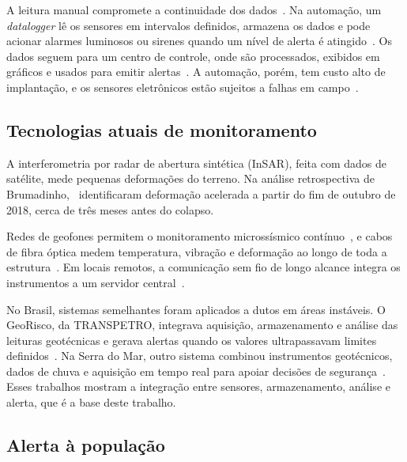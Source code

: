A leitura manual compromete a continuidade dos dados~\cite{anm2019relatorio, ibram2020tecnologias}. Na automação, um
\textit{datalogger} lê os sensores em intervalos definidos, armazena os
dados e pode acionar alarmes luminosos ou sirenes quando um nível de
alerta é atingido~\cite{kane2000instrumentation}.
Os dados seguem para um centro de controle, onde são processados,
exibidos em gráficos e usados para emitir alertas~\cite{machado2007,
silva2019sistema}. A automação, porém, tem custo alto de implantação, e
os sensores eletrônicos estão sujeitos a falhas em campo~\cite{quispe2018instrumentacao, machado2007}.

\subsection{Tecnologias atuais de monitoramento}
\label{subsec:tecnologias_monitoramento}

A interferometria por radar de abertura sintética (InSAR), feita com
dados de satélite, mede pequenas deformações do terreno. Na análise
retrospectiva de Brumadinho,~
identificaram deformação acelerada a partir do fim de outubro de 2018,
cerca de três meses antes do colapso.

Redes de geofones permitem o monitoramento microssísmico contínuo~\cite{tetratech2023mitigating}, e cabos de fibra óptica medem
temperatura, vibração e deformação ao longo de toda a estrutura~\cite{silixa2024dampulse, rstinstruments2022tailings}. Em locais remotos,
a comunicação sem fio de longo alcance integra os instrumentos a um
servidor central~\cite{worldsensing2024canadian}.

No Brasil, sistemas semelhantes foram aplicados a dutos em áreas
instáveis. O GeoRisco, da TRANSPETRO, integrava aquisição,
armazenamento e análise das leituras geotécnicas e gerava alertas quando
os valores ultrapassavam limites definidos~\cite{rocha2004georisco}.
Na Serra do Mar, outro sistema combinou instrumentos geotécnicos, dados
de chuva e aquisição em tempo real para apoiar decisões de segurança~\cite{costa2004pipeline}. Esses trabalhos mostram a integração entre
sensores, armazenamento, análise e alerta, que é a base deste trabalho.

\subsection{Alerta à população}
\label{subsec:alerta_populacao}

